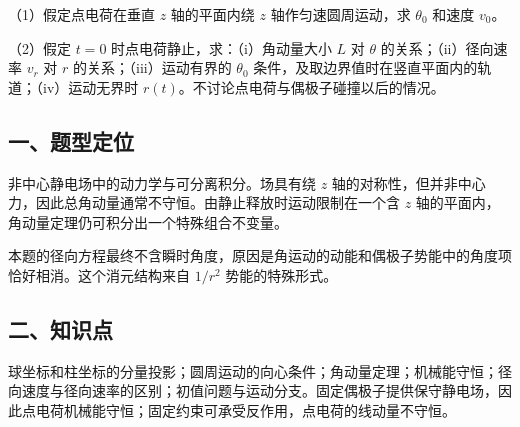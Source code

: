 \documentclass[12pt,a4paper,fontset=fandol]{ctexart}
\begin{document}
\begin{center}
\begin{minipage}{\linewidth}
\centering\begingroup{}
\ifdim\wd\diagrambox>.88\linewidth
\sbox{\diagrambox}{\resizebox{.88\linewidth}{!}{\usebox{\diagrambox}}}\fi
\ifdim\ht\diagrambox>.38\textheight
\resizebox{!}{.38\textheight}{\usebox{\diagrambox}}
\else\usebox{\diagrambox}\fi
\par{}\endgroup\end{minipage}\end{center}

（1）假定点电荷在垂直 \(z\) 轴的平面内绕 \(z\) 轴作匀速圆周运动，求
\(\theta_0\) 和速度 \(v_0\)。

（2）假定 \(t=0\) 时点电荷静止，求：（i）角动量大小 \(L\) 对 \(\theta\)
的关系；（ii）径向速率 \(v_r\) 对 \(r\) 的关系；（iii）运动有界的
\(\theta_0\) 条件，及取边界值时在竖直平面内的轨道；（iv）运动无界时
\(r(t)\)。不讨论点电荷与偶极子碰撞以后的情况。

\subsection{一、题型定位}\label{ux4e00ux9898ux578bux5b9aux4f4d-4}

非中心静电场中的动力学与可分离积分。场具有绕 \(z\)
轴的对称性，但并非中心力，因此总角动量通常不守恒。由静止释放时运动限制在一个含
\(z\) 轴的平面内，角动量定理仍可积分出一个特殊组合不变量。

本题的径向方程最终不含瞬时角度，原因是角运动的动能和偶极子势能中的角度项恰好相消。这个消元结构来自
\(1/r^2\) 势能的特殊形式。

\subsection{二、知识点}\label{ux4e8cux77e5ux8bc6ux70b9-4}

球坐标和柱坐标的分量投影；圆周运动的向心条件；角动量定理；机械能守恒；径向速度与径向速率的区别；初值问题与运动分支。固定偶极子提供保守静电场，因此点电荷机械能守恒；固定约束可承受反作用，点电荷的线动量不守恒。
\end{document}
